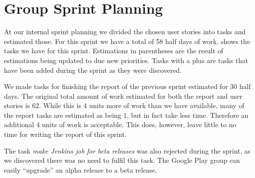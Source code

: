 \section{Group Sprint Planning}
At our internal sprint planning we divided the chosen user stories into tasks and estimated those. For this sprint we have a total of 58 half days of work.  shows the tasks we have for this sprint. Estimations in parentheses are the result of estimations being updated to due new priorities. Tasks with a plus are tasks that have been added during the sprint as they were discovered.

We made tasks for finishing the report of the previous sprint estimated for 30 half days. The original total amount of work estimated for both the report and user stories is 62. While this is 4 units more of work than we have available, many of the report tasks are estimated as being 1, but in fact take less time. Therefore an additional 4 units of work is acceptable. This does, however, leave little to no time for writing the report of this sprint.

The task \emph{make Jenkins job for beta releases} was also rejected during the sprint, as we discovered there was no need to fulfil this task. The Google Play group can easily ``upgrade'' an alpha release to a beta release.

